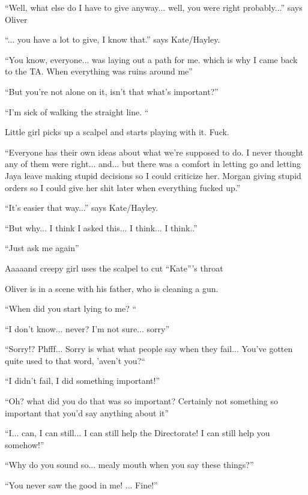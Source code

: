 ``Well, what else do I have to give anyway... well, you were right probably...'' says Oliver

``... you have a lot to give, I know that.'' says Kate/Hayley.

``You know, everyone... was laying out a path for me. which is why I came back to the TA.  When everything was ruins around me''

``But you're not alone on it, isn't that what's important?''

``I'm sick of walking the straight line. ``



Little girl picks up a scalpel and starts playing with it. Fuck. 



``Everyone has their own ideas about what we're supposed to do. I never thought any of them were right... and... but there was a comfort in letting go and letting Jaya leave making stupid decisions so I could criticize her.  Morgan giving stupid orders so I could give her shit later when everything fucked up.''

``It's easier that way...'' says Kate/Hayley.

``But why... I think I asked this... I think... I think..''

``Just ask me again''

Aaaaand creepy girl uses the scalpel to cut ``Kate'''s throat




Oliver is in a scene with his father, who is cleaning a gun. 

``When did you start lying to me? ``

``I don't know... never? I'm not sure... sorry''

``Sorry!? Phfff... Sorry is what what people say when they fail... You've gotten quite used to that word, 'aven't you?``

``I didn't fail, I did something important!''

``Oh? what did you do that was so important?  Certainly not something so important that you'd say anything about it''

``I... can, I can still... I can still help the Directorate! I can still help you somehow!''

``Why do you sound so... mealy mouth when you say these things?''

``You never saw the good in me!  ... Fine!''

